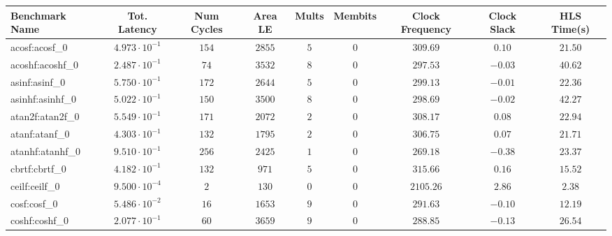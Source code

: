 \begin{tabular}{|l|c|c|c|c|c|c|c|c|}
\hline
Benchmark Name               & Tot. Latency            & Num Cycles & Area LE   & Mults   & Membits & Clock Frequency & Clock Slack & HLS Time(s) \\
\hline
acosf:acosf\_0               & $ 4.973 \cdot 10^{-1} $ & $ 154    $ & $ 2855  $ & $ 5   $ & $ 0   $ & $ 309.69      $ & $ 0.10    $ & $ 21.50   $ \\
acoshf:acoshf\_0             & $ 2.487 \cdot 10^{-1} $ & $ 74     $ & $ 3532  $ & $ 8   $ & $ 0   $ & $ 297.53      $ & $ -0.03   $ & $ 40.62   $ \\
asinf:asinf\_0               & $ 5.750 \cdot 10^{-1} $ & $ 172    $ & $ 2644  $ & $ 5   $ & $ 0   $ & $ 299.13      $ & $ -0.01   $ & $ 22.36   $ \\
asinhf:asinhf\_0             & $ 5.022 \cdot 10^{-1} $ & $ 150    $ & $ 3500  $ & $ 8   $ & $ 0   $ & $ 298.69      $ & $ -0.02   $ & $ 42.27   $ \\
atan2f:atan2f\_0             & $ 5.549 \cdot 10^{-1} $ & $ 171    $ & $ 2072  $ & $ 2   $ & $ 0   $ & $ 308.17      $ & $ 0.08    $ & $ 22.94   $ \\
atanf:atanf\_0               & $ 4.303 \cdot 10^{-1} $ & $ 132    $ & $ 1795  $ & $ 2   $ & $ 0   $ & $ 306.75      $ & $ 0.07    $ & $ 21.71   $ \\
atanhf:atanhf\_0             & $ 9.510 \cdot 10^{-1} $ & $ 256    $ & $ 2425  $ & $ 1   $ & $ 0   $ & $ 269.18      $ & $ -0.38   $ & $ 23.37   $ \\
cbrtf:cbrtf\_0               & $ 4.182 \cdot 10^{-1} $ & $ 132    $ & $ 971   $ & $ 5   $ & $ 0   $ & $ 315.66      $ & $ 0.16    $ & $ 15.52   $ \\
ceilf:ceilf\_0               & $ 9.500 \cdot 10^{-4} $ & $ 2      $ & $ 130   $ & $ 0   $ & $ 0   $ & $ 2105.26     $ & $ 2.86    $ & $ 2.38    $ \\
cosf:cosf\_0                 & $ 5.486 \cdot 10^{-2} $ & $ 16     $ & $ 1653  $ & $ 9   $ & $ 0   $ & $ 291.63      $ & $ -0.10   $ & $ 12.19   $ \\
coshf:coshf\_0               & $ 2.077 \cdot 10^{-1} $ & $ 60     $ & $ 3659  $ & $ 9   $ & $ 0   $ & $ 288.85      $ & $ -0.13   $ & $ 26.54   $ \\

\end{tabular}
